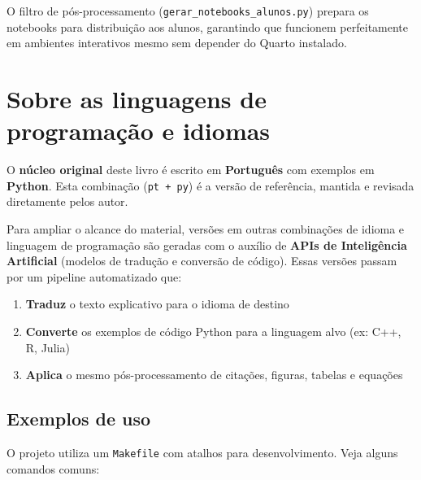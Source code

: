 \documentclass[
  portuguese,
  letterpaper,
  openany,
  oneside,
  12pt,
  a4paper]{book}
\providecommand{\tightlist}{%
  \setlength{\itemsep}{0pt}\setlength{\parskip}{0pt}}
\begin{document}
O filtro de pós-processamento (\texttt{gerar\_notebooks\_alunos.py})
prepara os notebooks para distribuição aos alunos, garantindo que
funcionem perfeitamente em ambientes interativos mesmo sem depender do
Quarto instalado.

\section*{Sobre as linguagens de programação e
idiomas}\label{sobre-as-linguagens-de-programauxe7uxe3o-e-idiomas}


O \textbf{núcleo original} deste livro é escrito em \textbf{Português}
com exemplos em \textbf{Python}. Esta combinação (\texttt{pt\ +\ py}) é
a versão de referência, mantida e revisada diretamente pelos autor.

Para ampliar o alcance do material, versões em outras combinações de
idioma e linguagem de programação são geradas com o auxílio de
\textbf{APIs de Inteligência Artificial} (modelos de tradução e
conversão de código). Essas versões passam por um pipeline automatizado
que:

\begin{enumerate}
\def\labelenumi{\arabic{enumi}.}
\tightlist
\item
  \textbf{Traduz} o texto explicativo para o idioma de destino
\item
  \textbf{Converte} os exemplos de código Python para a linguagem alvo
  (ex: C++, R, Julia)
\item
  \textbf{Aplica} o mesmo pós-processamento de citações, figuras,
  tabelas e equações
\end{enumerate}

\subsection*{Exemplos de uso}\label{exemplos-de-uso}

O projeto utiliza um \texttt{Makefile} com atalhos para desenvolvimento.
Veja alguns comandos comuns:
\end{document}
